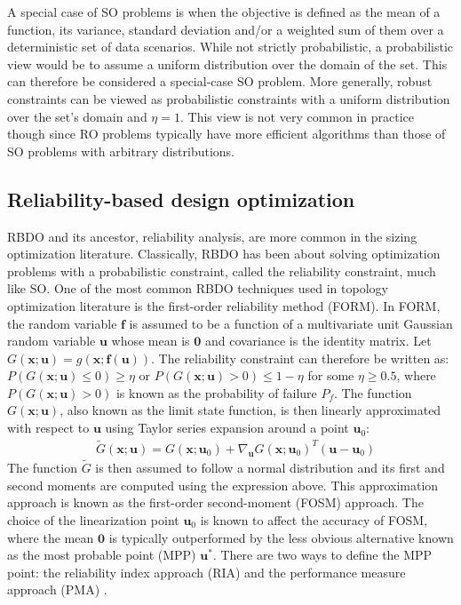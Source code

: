A special case of SO problems is when the objective is defined as the mean of a function, its variance, standard deviation and/or a weighted sum of them over a deterministic set of data scenarios. While not strictly probabilistic, a probabilistic view would be to assume a uniform distribution over the domain of the set. This can therefore be considered a special-case SO problem. More generally, robust constraints can be viewed as probabilistic constraints with a uniform distribution over the set's domain and $\eta = 1$. This view is not very common in practice though since RO problems typically have more efficient algorithms than those of SO problems with arbitrary distributions.

\subsection{Reliability-based design optimization}

RBDO and its ancestor, reliability analysis, are more common in the sizing optimization literature. Classically, RBDO has been about solving optimization problems with a probabilistic constraint, called the reliability constraint, much like SO. One of the most common RBDO techniques used in topology optimization literature is the first-order reliability method (FORM). In FORM, the random variable $\bm{f}$ is assumed to be a function of a multivariate unit Gaussian random variable $\bm{u}$ whose mean is $\bm{0}$ and covariance is the identity matrix. Let $G(\bm{x}; \bm{u}) = g(\bm{x}; \bm{f}(\bm{u}))$. The reliability constraint can therefore be written as: $P(G(\bm{x}; \bm{u}) \leq 0) \geq \eta$ or $P(G(\bm{x}; \bm{u}) > 0) \leq 1 - \eta$ for some $\eta \geq 0.5$, where $P(G(\bm{x}; \bm{u}) > 0)$ is known as the probability of failure $P_f$. The function $G(\bm{x}; \bm{u})$, also known as the limit state function, is then linearly approximated with respect to $\bm{u}$ using Taylor series expansion around a point $\bm{u}_0$:
\begin{align}
 & \tilde{G}(\bm{x}; \bm{u}) = G(\bm{x}; \bm{u}_0) + \nabla_{\bm{u}} G(\bm{x}; \bm{u}_0)^T(\bm{u} - \bm{u}_0)
\end{align}
The function $\tilde{G}$ is then assumed to follow a normal distribution and its first and second moments are computed using the expression above. This approximation approach is known as the first-order second-moment (FOSM) approach. The choice of the linearization point $\bm{u}_0$ is known to affect the accuracy of FOSM, where the mean $\bm{0}$ is typically outperformed by the less obvious alternative known as the most probable point (MPP) $\bm{u}^*$. There are two ways to define the MPP point: the reliability index approach (RIA) \citep{Chang1996,Tu1999} and the performance measure approach (PMA) \citep{Tu1999}.

